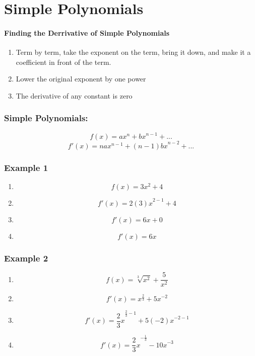\documentclass[a4paper,11pt]{book}
\begin{document}
\section{Simple Polynomials}
\paragraph{Finding the Derrivative of Simple Polynomials}
\normalsize 
\begin{enumerate}
  \item Term by term, take the exponent on the term, bring it down, and make it a coefficient in front of the term.
  \item Lower the original exponent by one power
  \item The derivative of any constant is zero
\end{enumerate}

\subsubsection{Simple Polynomials:}
\LARGE 
\[ f(x) = ax^n + {bx}^{n-1} + ... \]
\[ f'(x) = {nax}^{n-1} + {(n-1)bx}^{n-2} + ... \]

\subsubsection{Example 1}
\LARGE 
\begin{enumerate}
  \item \[ f(x) = 3x^2 + 4 \]
  \item \[ f'(x) = {2(3)x}^{2-1} + 4 \]
  \item \[ f'(x) = 6x + 0 \]
  \item \[ f'(x) = 6x \] 
\end{enumerate}
\normalsize 


\subsubsection{Example 2}
\LARGE 
\begin{enumerate}
  \item \[ f(x) = \sqrt[3]{x^2} + \frac{5}{x^2} \]
  \item \[ f'(x) ={x}^{\frac{2}{3}} + {5x}^{-2} \]
  \item \[ f'(x) = {\frac{2}{3}x}^{\frac{2}{3}-1} + {5(-2)x}^{-2-1} \]
\item \[ f'(x) = {\frac{2}{3}x}^{-\frac{1}{3}} - {10x}^{-3} \]
\end{enumerate}
\normalsize 
\end{document}

